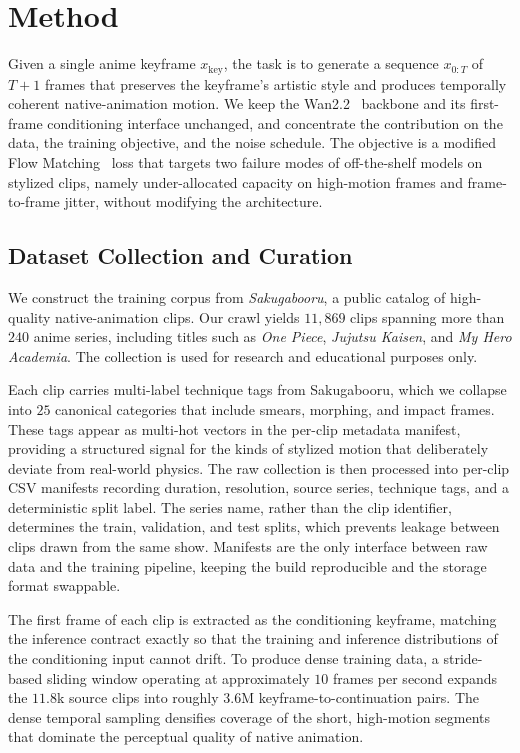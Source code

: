 \documentclass[10pt,twocolumn]{article}
\begin{document}
\section{Method}

Given a single anime keyframe $x_{\text{key}}$, the task is to generate a sequence $x_{0:T}$ of $T+1$ frames that preserves the keyframe's artistic style and produces temporally coherent native-animation motion. We keep the Wan2.2~\cite{wan2025team} backbone and its first-frame conditioning interface unchanged, and concentrate the contribution on the data, the training objective, and the noise schedule. The objective is a modified Flow Matching~\cite{lipman2023flow} loss that targets two failure modes of off-the-shelf models on stylized clips, namely under-allocated capacity on high-motion frames and frame-to-frame jitter, without modifying the architecture.

\subsection{Dataset Collection and Curation}

We construct the training corpus from \emph{Sakugabooru}, a public catalog of high-quality native-animation clips. Our crawl yields $11{,}869$ clips spanning more than $240$ anime series, including titles such as \emph{One Piece}, \emph{Jujutsu Kaisen}, and \emph{My Hero Academia}. The collection is used for research and educational purposes only.

Each clip carries multi-label technique tags from Sakugabooru, which we collapse into $25$ canonical categories that include smears, morphing, and impact frames. These tags appear as multi-hot vectors in the per-clip metadata manifest, providing a structured signal for the kinds of stylized motion that deliberately deviate from real-world physics. The raw collection is then processed into per-clip CSV manifests recording duration, resolution, source series, technique tags, and a deterministic split label. The series name, rather than the clip identifier, determines the train, validation, and test splits, which prevents leakage between clips drawn from the same show. Manifests are the only interface between raw data and the training pipeline, keeping the build reproducible and the storage format swappable.

The first frame of each clip is extracted as the conditioning keyframe, matching the inference contract exactly so that the training and inference distributions of the conditioning input cannot drift. To produce dense training data, a stride-based sliding window operating at approximately $10$ frames per second expands the $11.8$k source clips into roughly $3.6$M keyframe-to-continuation pairs. The dense temporal sampling densifies coverage of the short, high-motion segments that dominate the perceptual quality of native animation.
\end{document}
